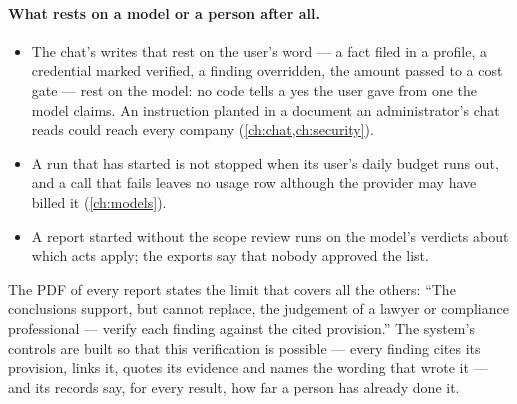 \paragraph{What rests on a model or a person after all.}
\begin{itemize}
  \item The chat's writes that rest on the user's word --- a fact filed in a profile, a
    credential marked verified, a
    finding overridden, the amount passed to a cost gate --- rest on the model: no code tells
    a yes the user gave from one the model claims. An instruction planted in a document an
    administrator's chat reads could reach every company (\cref{ch:chat,ch:security}).
  \item A run that has started is not stopped when its user's daily budget runs out, and a
    call that fails leaves no usage row although the provider may have billed it
    (\cref{ch:models}).
  \item A report started without the scope review runs on the model's verdicts about which
    acts apply; the exports say that nobody approved the list.
\end{itemize}

The PDF of every report states the limit that covers all the others: \enquote{The conclusions
support, but cannot replace, the judgement of a lawyer or compliance professional --- verify
each finding against the cited provision.} The system's controls are built so that this
verification is possible --- every finding cites its provision, links it, quotes its evidence
and names the wording that wrote it --- and its records say, for every result, how far a person
has already done it.
